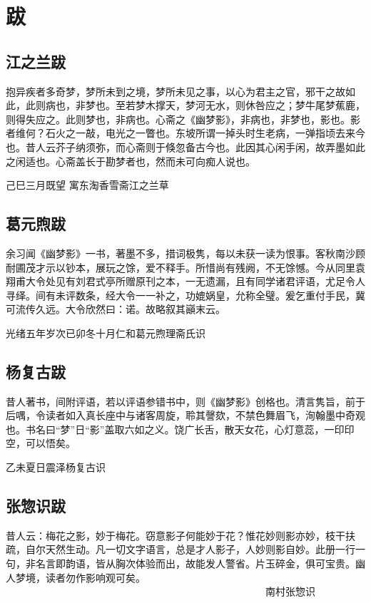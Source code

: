 \chapter{跋}

\section{江之兰跋}
抱异疾者多奇梦，梦所未到之境，梦所未见之事，以心为君主之官，邪干之故如此，此则病也，非梦也。至若梦木撑天，梦河无水，则休咎应之；梦牛尾梦蕉鹿，则得失应之。此则梦也，非病也。心斋之《幽梦影》，非病也，非梦也，影也。影者维何？石火之一敲，电光之一瞥也。东坡所谓一掉头时生老病，一弹指顷去来今也。昔人云芥子纳须弥，而心斋则于倏忽备古今也。此因其心闲手闲，故弄墨如此之闲适也。心斋盖长于勘梦者也，然而未可向痴人说也。



己巳三月既望 寓东淘香雪斋江之兰草


\section{葛元煦跋}
余习闻《幽梦影》一书，著墨不多，措词极隽，每以未获一读为恨事。客秋南沙顾耐圃茂才示以钞本，展玩之馀，爱不释手。所惜尚有残阙，不无馀憾。今从同里袁翔甫大令处见有刘君式亭所赠原刊之本，一无遗漏，且有同学诸君评语，尤足令人寻绎。间有未评数条，经大令一一补之，功媲娲皇，允称全璧。爰乞重付手民，冀可流传久远。大令欣然曰：诺。故略叙其巓末云。



光绪五年岁次已卯冬十月仁和葛元煦理斋氏识


\section{杨复古跋}
昔人著书，间附评语，若以评语参错书中，则《幽梦影》创格也。清言隽旨，前于后喁，令读者如入真长座中与诸客周旋，聆其謦欬，不禁色舞眉飞，洵翰墨中奇观也。书名曰“梦”日“影”盖取六如之义。饶广长舌，散天女花，心灯意蕊，一印印空，可以悟矣。



乙未夏日震泽杨复古识


\section{张惣识跋}
昔人云：梅花之影，妙于梅花。窃意影子何能妙于花？惟花妙则影亦妙，枝干扶疏，自尔天然生动。凡一切文字语言，总是才人影子，人妙则影自妙。此册一行一句，非名言即韵语，皆从胸次体验而出，故能发人警省。片玉碎金，俱可宝贵。幽人梦境，读者勿作影响观可矣。 　　　　　　　　　　　　　　　　　　　　　　　　　　南村张惣识
